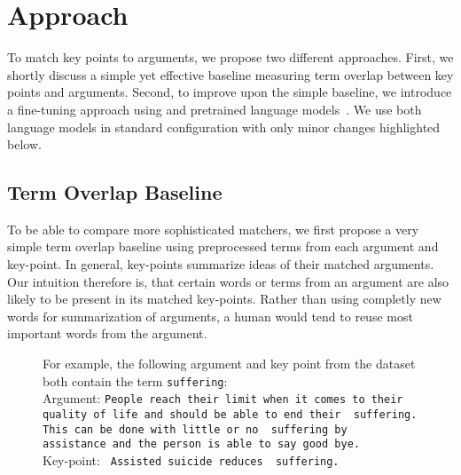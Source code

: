 \section{Approach}\label{approach}

To match key points to arguments, we propose two different approaches.
First, we shortly discuss a simple yet effective baseline measuring term overlap between key points and arguments.
Second, to improve upon the simple baseline, we introduce a fine-tuning approach using \Bert and \Roberta pretrained language models~\cite{DevlinCLT2019,LiuOGDJCLLZS2019}. We use both language models in standard configuration with only minor changes highlighted below.

\subsection{Term Overlap Baseline}
To be able to compare more sophisticated matchers, we first propose a very simple term overlap baseline using preprocessed terms from each argument and key-point. 
In general, key-points summarize ideas of their matched arguments.
Our intuition therefore is, that certain words or terms from an argument are also likely to be present in its matched key-points.
Rather than using completly new words for summarization of arguments, a human would tend to reuse most important words from the argument.

\begin{figure}[H]
    For example, the following argument and key point from the \ArgKP dataset both contain the term \texttt{suffering}: \\
    Argument: \texttt{People reach their limit when it comes to their quality of life and should be able to end their {\color{blue} suffering}. This can be done with little or no {\color{blue} suffering} by {\color{orange} assistance} and the person is able to say good bye.} \\
    Key-point: \texttt{{\color{orange} Assisted} suicide reduces {\color{blue} suffering}.}    
\end{figure}


